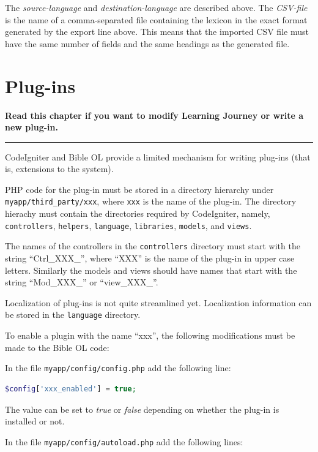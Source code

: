 \documentclass[11pt,oneside,a4paper]{memoir}
\begin{document}
The \emph{source-language} and \emph{destination-language} are described above. The \emph{CSV-file}
is the name of a comma-separated file containing the lexicon in the exact format generated by the export line
above. This means that the imported CSV file must have the same number of fields and the same
headings as the generated file.




\chapter{Plug-ins}

\textbf{Read this chapter if you want to modify Learning Journey or write a new plug-in.}
\plainbreak{3}

CodeIgniter and Bible OL provide a limited mechanism for writing plug-ins (that is, extensions to
the system).

PHP code for the plug-in must be stored in a directory hierarchy under
\texttt{myapp/third\_party/xxx}, where \texttt{xxx} is the name of the plug-in. The directory
hierachy must contain the directories required by CodeIgniter, namely, \texttt{controllers},
\texttt{helpers}, \texttt{language}, \texttt{libraries}, \texttt{models}, and \texttt{views}.

The names of the controllers in the \texttt{controllers} directory must start with the string
``Ctrl\_XXX\_'', where ``XXX'' is the name of the plug-in in upper case letters. Similarly the
models and views should have names that start with the string ``Mod\_XXX\_'' or ``view\_XXX\_''.

Localization of plug-ins is not quite streamlined yet. Localization information can be stored in the
\texttt{language} directory.

To enable a plugin with the name ``xxx'', the following modifications must be made to the Bible OL
code:

In the file \texttt{myapp/config/config.php} add the following line:

\begin{lstlisting}[language=PHP]
$config['xxx_enabled'] = true;
\end{lstlisting}

The value can be set to \emph{true} or \emph{false} depending on whether the plug-in is installed or
not.

In the file \texttt{myapp/config/autoload.php} add the following lines:
\end{document}
